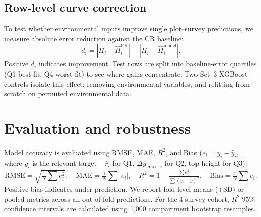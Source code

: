 \subsection*{Row-level curve correction}
\label{sec:rq2a-method}
To test whether environmental inputs improve single plot--survey predictions, we measure absolute error reduction against the CR baseline:
\begin{equation}
d_i = \left|H_i-\hat H_i^{\mathrm{CR}}\right| - \left|H_i-\hat H_i^{\mathrm{model}}\right|.
\label{eq:residual-reduction}
\end{equation}
Positive $d_i$ indicates improvement. Test rows are split into baseline-error quartiles (Q1 best fit, Q4 worst fit) to see where gains concentrate. Two Set~3 XGBoost controls isolate this effect: removing environmental variables, and refitting from scratch on permuted environmental data.


\section{Evaluation and robustness} \label{sec:eval-robustness}
Model accuracy is evaluated using RMSE, MAE, $R^2$, and Bias ($e_i = y_i - \hat y_i$, where $y_i$ is the relevant target -- $\bar r_i$ for Q1, $\Delta y_{\max,i}$ for Q2, top height for Q3):
\begin{equation}
\mathrm{RMSE}=\sqrt{\tfrac{1}{N}\textstyle\sum e_i^2}, \quad
\mathrm{MAE}=\tfrac{1}{N}\textstyle\sum |e_i|, \quad
R^2=1-\tfrac{\sum e_i^2}{\sum (y_i-\bar y)^2}, \quad
\mathrm{Bias}=\tfrac{1}{N}\textstyle\sum e_i.
\label{eq:eval-summary}
\end{equation}
Positive bias indicates under-prediction. We report fold-level means ($\pm\text{SD}$) or pooled metrics across all out-of-fold predictions. For the 4-survey cohort, $R^2$ $95\%$ confidence intervals are calculated using 1,000 compartment bootstrap resamples.

